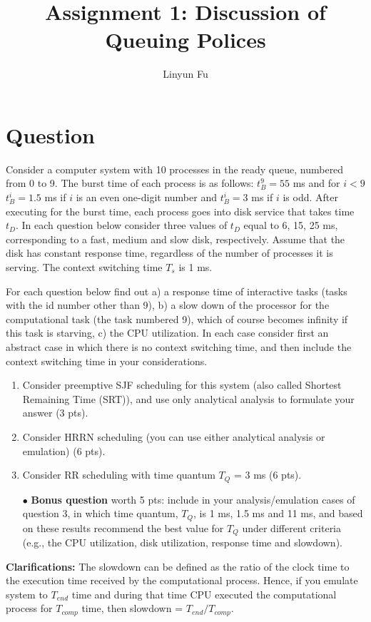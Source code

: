 \documentclass[12pt,letterpaper]{article}
\author{Linyun Fu}
\title{Assignment 1: Discussion of Queuing Polices}
\begin{document}
\maketitle
\part*{Question}
Consider a computer system with 10 processes in the ready queue, numbered from 0 to 9. The burst time of each process is as follows: $t_B^9=55$ ms and for $i < 9$ $t_B^i = 1.5$ ms if $i$ is an even one-digit number and $t_B^i = 3$ ms if $i$ is odd. After executing for the
burst time, each process goes into disk service that takes time $t_D$. In each question below
consider three values of $t_D$ equal to 6, 15, 25 ms, corresponding to a fast, medium and
slow disk, respectively. Assume that the disk has constant response time, regardless of
the number of processes it is serving. The context switching time $T_s$ is 1 ms.

For each question below find out a) a response time of interactive tasks (tasks with the id number other than 9), b) a slow down of the processor for the computational task
(the task numbered 9), which of course becomes infinity if this task is starving, c) the
CPU utilization. In each case consider first an abstract case in which there is no context
switching time, and then include the context switching time in your considerations.

\begin{enumerate}
\item Consider preemptive SJF scheduling for this system (also called Shortest
Remaining Time (SRT)), and use only analytical analysis to formulate your
answer (3 pts).
\item Consider HRRN scheduling (you can use either analytical analysis or emulation)
(6 pts).
\item Consider RR scheduling with time quantum $T_Q$ = 3 ms (6 pts).
\item[$\bullet$] {\bf Bonus question} worth 5 pts: include in your analysis/emulation cases of question 3, in
which time quantum, $T_Q$, is 1 ms, 1.5 ms and 11 ms, and based on these results recommend
the best value for $T_Q$ under different criteria (e.g., the CPU utilization, disk utilization, response time and slowdown).
\end{enumerate}

{\bf Clarifications:} The slowdown can be defined as the ratio of the clock time to the
execution time received by the computational process. Hence, if you emulate system to
$T_{end}$ time and during that time CPU executed the computational process for $T_{comp}$ time, then slowdown = $T_{end}/T_{comp}$.
\end{document}
